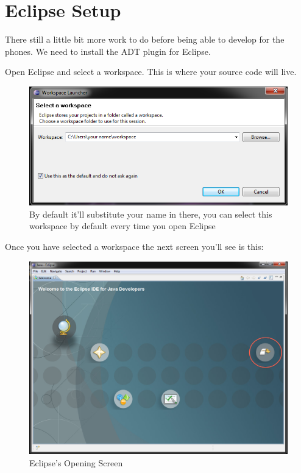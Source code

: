 \section{Eclipse Setup}

There still a little bit more work to do before being able to develop for the phones. We need to install the ADT plugin for Eclipse.

Open Eclipse and select a workspace. This is where your source code will live.

\begin{figure}[!ht]
  \includegraphics[width=\textwidth]{./images/workspace.png}%
  \caption{By default it'll substitute your name in there, you can select this workspace by default every time you open Eclipse}
  \label{fig:workspace}
\end{figure}

Once you have selected a workspace the next screen you'll see is this:

\begin{figure}[!ht]
  \includegraphics[width=\textwidth]{./images/go_to_workbench.png}%
  \caption{Eclipse's Opening Screen}
  \label{fig:workbench}
\end{figure}

